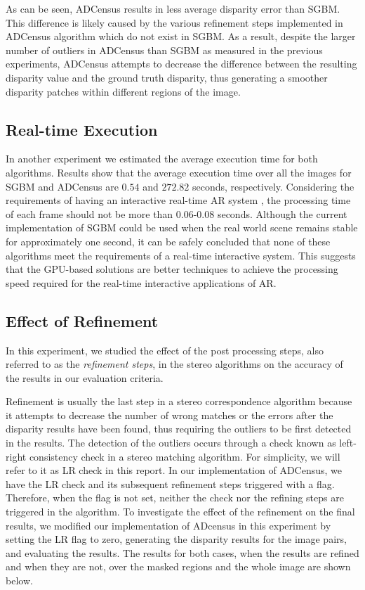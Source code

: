 As can be seen, ADCensus results in less average disparity error than SGBM. This difference is likely caused by the various refinement steps
implemented in ADCensus algorithm which do not exist in SGBM.
As a result, despite the larger number of outliers in ADCensus than SGBM as measured in the previous experiments,
ADCensus attempts to decrease the difference between the resulting disparity value and the ground truth disparity, thus generating a smoother disparity patches
within different regions of the image.

\subsection{Real-time Execution}
In another experiment we estimated the average execution time for both algorithms. Results show that the average execution time over all the images 
for SGBM and ADCensus are $0.54$ and $272.82$ seconds, respectively.
Considering the requirements of having an interactive real-time AR system \cite{hertz00}, the processing time of each frame should not be more than 0.06-0.08 seconds.
Although the current implementation of SGBM could be used when the real world scene remains stable for approximately one second, it can be safely concluded that
none of these algorithms meet the requirements of a real-time interactive system.
This suggests that the GPU-based solutions are better techniques to achieve the processing speed required for the real-time 
interactive applications of AR.

\subsection{Effect of Refinement}
In this experiment, we studied the effect of the post processing steps, also referred to as the \textit{refinement steps}, 
in the stereo algorithms on the accuracy of the results in our evaluation criteria. 

Refinement is usually the last step in a stereo correspondence algorithm because it attempts to decrease the 
number of wrong matches or the errors after the disparity results have been found, thus requiring the outliers to be first detected in the results. 
The detection of the outliers occurs through a check known as left-right consistency check in a stereo matching algorithm. For simplicity, we will refer
to it as LR check in this report.
In our implementation of ADCensus, we have the LR check and its subsequent refinement steps triggered with a flag.
Therefore, when the flag is not set, neither the check nor the refining steps are triggered in the algorithm.
To investigate the effect of the refinement on the final results, we modified our implementation 
of ADcensus in this experiment by setting the LR flag to zero, generating the disparity results for the image pairs, and evaluating the results.
The results for both cases, when the results are refined and when they are not, over the masked regions and the whole image are shown below.

